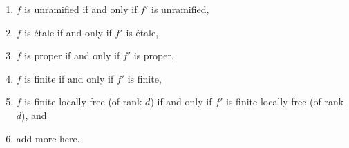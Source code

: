 \begin{lemma}
\begin{enumerate}
\label{item-smooth-fp-over-ft}
\item $f$ is unramified if and only if $f'$ is unramified,
\label{item-unramified-fp-over-ft}
\item $f$ is \'etale if and only if $f'$ is \'etale,
\label{item-etale-fp-over-ft}
\item $f$ is proper if and only if $f'$ is proper,
\label{item-proper-fp-over-ft}
\item $f$ is finite if and only if $f'$ is finite,
\label{item-finite-fp-over-ft}
\item
\label{item-finite-locally-free-fp-over-ft}
$f$ is finite locally free (of rank $d$) if and only if $f'$
is finite locally free (of rank $d$), and
\item add more here.
\end{enumerate}
\end{lemma}

